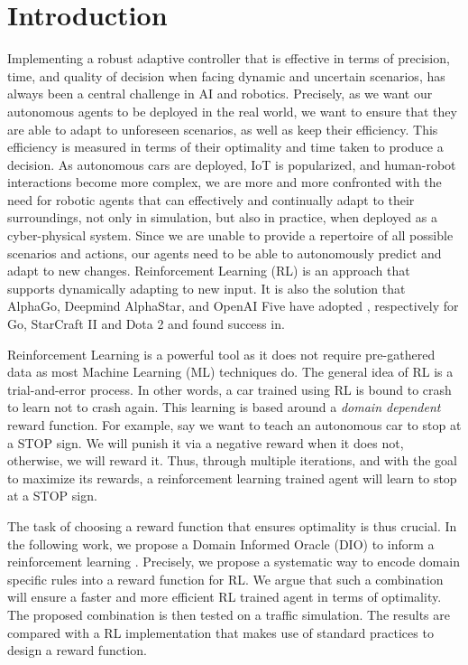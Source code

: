 \documentclass[a4paper,11pt]{article}
\theoremstyle{definition}
\begin{document}
\section{Introduction}
Implementing a robust adaptive controller that is effective in terms
of precision, time, and quality of decision
when facing dynamic and uncertain scenarios, has always been a central
challenge in AI and robotics. Precisely, as we want our autonomous agents to be deployed 
in the real world, we want to ensure that they are able to adapt to unforeseen scenarios, as well as 
keep their efficiency. This efficiency is measured in terms of their optimality and time taken to produce a decision. 
%
As autonomous cars are deployed, IoT is popularized, and human-robot interactions become more complex, we
are more and more confronted with the need for robotic agents that can effectively and continually adapt
to their surroundings, not only in simulation, but also in practice, when deployed as a cyber-physical system. 
Since we are unable to provide a repertoire of all possible scenarios and actions,
our agents need to be able to autonomously predict and adapt to new
changes. Reinforcement Learning (RL) is an approach that
supports dynamically adapting to new input. It is also the solution that AlphaGo, Deepmind AlphaStar, and OpenAI Five have
adopted \cite{li2019reinforcement}, respectively for Go, StarCraft II and Dota 2 and found success in. 

\medskip

Reinforcement Learning is a powerful tool as it does not require pre-gathered data as most Machine Learning (ML) 
techniques do. The general idea of RL is a trial-and-error process. In other words, a car trained using RL is bound to 
crash to learn not to crash again. This learning is based around a \textit{domain dependent} reward function. For example, say we want to teach an autonomous car to stop at a STOP sign. We will 
punish it via a negative reward when it does not, otherwise, we will reward it. Thus, through multiple iterations, 
and with the goal to maximize its rewards, a reinforcement learning trained agent will learn to stop at a STOP sign. 
%

\medskip

The task of choosing a reward function that ensures optimality is thus crucial. In the following work, we propose a Domain Informed Oracle (DIO) to
inform a reinforcement learning . Precisely, we propose a systematic way to encode domain specific rules into a reward function for RL. We argue that such a combination will ensure 
a faster and more efficient RL trained agent in terms of optimality. The proposed combination is then tested on a traffic simulation. The results are compared with 
a RL implementation that makes use of standard practices to design a reward function. 
\end{document}
